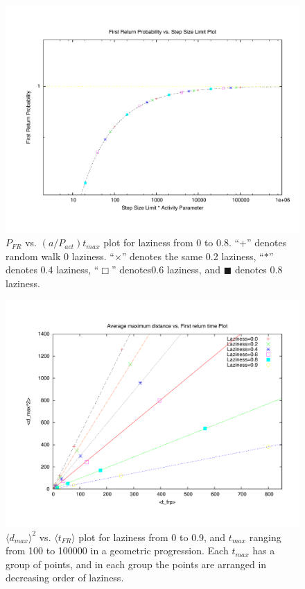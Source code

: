 \documentclass[12pt]{article}
\begin{document}
\newpage
\begin{figure}
\centering
\includegraphics[width=\textwidth]{scaled_frp.pdf}
\caption{$P_{FR}$ vs. $(a/P_{act})t_{max}$ plot for laziness from 0 to 0.8. ``+'' denotes random walk 0 laziness. ``$\times$'' denotes the same 0.2 laziness, ``$\ast$'' denotes 0.4 laziness, ``$\Box$'' denotes0.6  laziness, and $\blacksquare$ denotes 0.8 laziness.}
\label{fig:frp_scale}
\end{figure}


\newpage
\begin{figure}
\centering
\includegraphics[width=\textwidth]{tfrp_unscaled.pdf}
\caption{$\langle d_{{max}} \rangle ^2$ vs. $\langle t_{FR} \rangle$ plot for laziness from 0 to 0.9, and $t_{max}$ ranging from 100 to 100000 in a geometric progression. Each $t_{max}$ has a group of points, and in each group the points are arranged in decreasing order of laziness.}
\label{fig:pow_law}
\end{figure}
\end{document}
